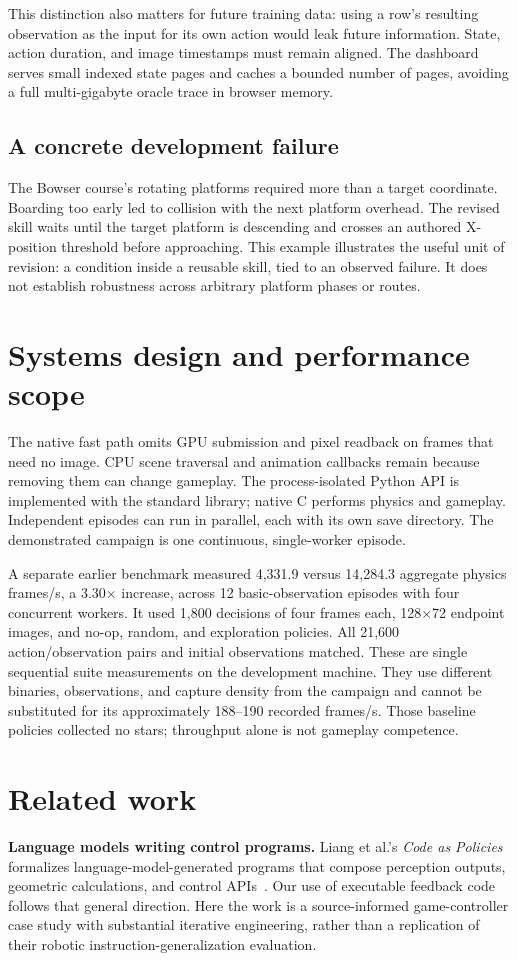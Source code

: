 \documentclass[10pt,letterpaper]{article}
\begin{document}
This distinction also matters for future training data: using a row's resulting observation as the input for its own action would leak future information. State, action duration, and image timestamps must remain aligned. The dashboard serves small indexed state pages and caches a bounded number of pages, avoiding a full multi-gigabyte oracle trace in browser memory.

\subsection{A concrete development failure}
The Bowser course's rotating platforms required more than a target coordinate. Boarding too early led to collision with the next platform overhead. The revised skill waits until the target platform is descending and crosses an authored X-position threshold before approaching. This example illustrates the useful unit of revision: a condition inside a reusable skill, tied to an observed failure. It does not establish robustness across arbitrary platform phases or routes.

\section{Systems design and performance scope}
The native fast path omits GPU submission and pixel readback on frames that need no image. CPU scene traversal and animation callbacks remain because removing them can change gameplay. The process-isolated Python API is implemented with the standard library; native C performs physics and gameplay. Independent episodes can run in parallel, each with its own save directory. The demonstrated campaign is one continuous, single-worker episode.

A separate earlier benchmark measured 4,331.9 versus 14,284.3 aggregate physics frames/s, a 3.30$\times$ increase, across 12 basic-observation episodes with four concurrent workers. It used 1,800 decisions of four frames each, 128$\times$72 endpoint images, and no-op, random, and exploration policies. All 21,600 action/observation pairs and initial observations matched. These are single sequential suite measurements on the development machine. They use different binaries, observations, and capture density from the campaign and cannot be substituted for its approximately 188--190 recorded frames/s. Those baseline policies collected no stars; throughput alone is not gameplay competence.

\clearpage
\section{Related work}
\textbf{Language models writing control programs.} Liang et al.'s \emph{Code as Policies} formalizes language-model-generated programs that compose perception outputs, geometric calculations, and control APIs~\cite{cap}. Our use of executable feedback code follows that general direction. Here the work is a source-informed game-controller case study with substantial iterative engineering, rather than a replication of their robotic instruction-generalization evaluation.
\end{document}
